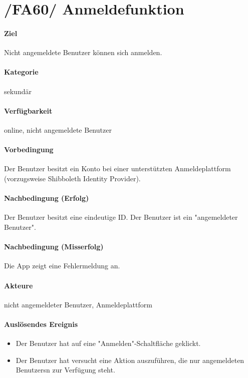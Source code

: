 \section{/FA60/ Anmeldefunktion}
\label{Anmeldefunktion}
\label{/FA60/}
\paragraph{Ziel}
Nicht angemeldete \Gls{Benutzer} können sich anmelden.
\paragraph{Kategorie}
sekundär
\paragraph{Verfügbarkeit}
online, nicht angemeldete Benutzer
\paragraph{Vorbedingung}
Der \Gls{Benutzer} besitzt ein Konto bei einer unterstützten Anmeldeplattform (vorzugsweise Shibboleth Identity Provider).
\paragraph{Nachbedingung (Erfolg)}
Der \Gls{Benutzer} besitzt eine eindeutige \Gls{ID}. Der \Gls{Benutzer} ist ein "angemeldeter \Gls{Benutzer}".
\paragraph{Nachbedingung (Misserfolg)}
Die App zeigt eine Fehlermeldung an.
\paragraph{Akteure}
nicht angemeldeter \Gls{Benutzer}, Anmeldeplattform
\paragraph{Auslösendes Ereignis}
\begin{itemize}
      \item Der \Gls{Benutzer} hat auf eine "Anmelden"-Schaltfläche geklickt.
      \item Der \Gls{Benutzer} hat versucht eine Aktion auszuführen, die nur angemeldeten \Glspl{Benutzer}n zur Verfügung steht.
\end{itemize}
